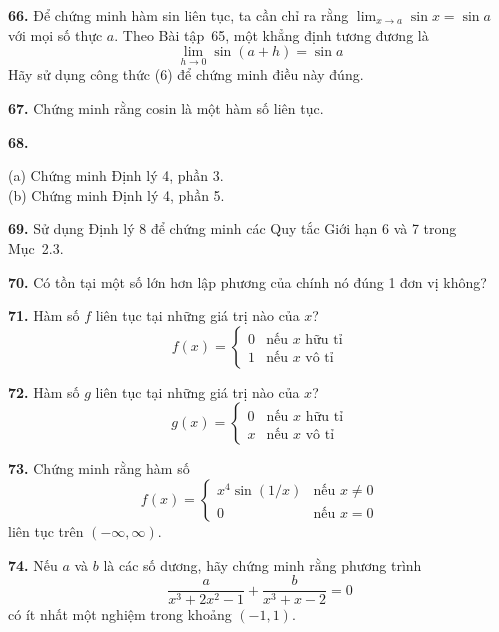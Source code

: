 \begin{minipage}[t]{0.485\textwidth}
\textbf{66.} Để chứng minh hàm sin liên tục, ta cần chỉ ra rằng $\lim_{x \to a} \sin x = \sin a$ với mọi số thực $a$. Theo Bài tập~65, một khẳng định tương đương là
\[
\lim_{h \to 0} \sin(a + h) = \sin a
\]
Hãy sử dụng công thức (6) để chứng minh điều này đúng.

\vspace{0.6em}
\textbf{67.} Chứng minh rằng cosin là một hàm số liên tục.

\vspace{0.6em}
\noindent\textbf{68.}\hspace{0.5em}%
\begin{minipage}[t]{0.88\linewidth}
\textnormal{(a)} Chứng minh Định lý 4, phần 3.\\[2pt]
\textnormal{(b)} Chứng minh Định lý 4, phần 5.
\end{minipage}

\vspace{0.6em}
\textbf{69.} Sử dụng Định lý 8 để chứng minh các Quy tắc Giới hạn 6 và 7 trong Mục~2.3.

\vspace{0.6em}
\textbf{70.} Có tồn tại một số lớn hơn lập phương của chính nó đúng 1 đơn vị không?

\vspace{0.6em}
\textbf{71.} Hàm số $f$ liên tục tại những giá trị nào của $x$?
\[
f(x) = \begin{cases} 
0 & \text{nếu } x \text{ hữu tỉ} \\[2pt] 
1 & \text{nếu } x \text{ vô tỉ} 
\end{cases}
\]

\vspace{0.5em}
\textbf{72.} Hàm số $g$ liên tục tại những giá trị nào của $x$?
\[
g(x) = \begin{cases} 
0 & \text{nếu } x \text{ hữu tỉ} \\[2pt] 
x & \text{nếu } x \text{ vô tỉ} 
\end{cases}
\]

\vspace{0.5em}
\textbf{73.} Chứng minh rằng hàm số
\[
f(x) = \begin{cases} 
x^4 \sin(1/x) & \text{nếu } x \neq 0 \\[2pt] 
0 & \text{nếu } x = 0 
\end{cases}
\]
liên tục trên $(-\infty, \infty)$.

\vspace{0.6em}
\textbf{74.} Nếu $a$ và $b$ là các số dương, hãy chứng minh rằng phương trình
\[
\frac{a}{x^3 + 2x^2 - 1} + \frac{b}{x^3 + x - 2} = 0
\]
có ít nhất một nghiệm trong khoảng $(-1, 1)$.


\end{minipage}
